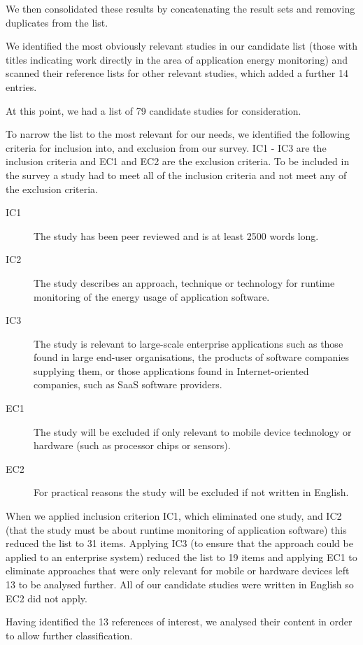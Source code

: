 We then consolidated these results by concatenating the result sets and removing duplicates from the list.

We identified the most obviously relevant studies in our candidate list (those with titles indicating work directly in the area of application energy monitoring) and scanned their reference lists for other relevant studies, which added a further 14 entries.

At this point, we had a list of 79 candidate studies for consideration.

To narrow the list to the most relevant for our needs, we identified the following criteria for inclusion into, and exclusion from our survey.  IC1 - IC3 are the inclusion criteria and EC1 and EC2 are the exclusion criteria.  To be included in the survey a study had to meet all of the inclusion criteria and not meet any of the exclusion criteria.

\begin{description}
	\item[IC1] The study has been peer reviewed and is at least 2500 words long.
	\item[IC2] The study describes an approach, technique or technology for runtime monitoring of the energy usage of application software.
	\item[IC3] The study is relevant to large-scale enterprise applications such as those found in large end-user organisations, the products of software companies supplying them, or those applications found in Internet-oriented companies, such as SaaS software providers.
	\item[EC1] The study will be excluded if only relevant to mobile device technology or hardware (such as processor chips or sensors).
	\item[EC2] For practical reasons the study will be excluded if not written in English.
\end{description}

When we applied inclusion criterion IC1, which eliminated one study, and IC2 (that the study must be about runtime monitoring of application software) this reduced the list to 31 items.  Applying IC3 (to ensure that the approach could be applied to an enterprise system) reduced the list to 19 items and applying EC1 to eliminate approaches that were only relevant for mobile or hardware devices left 13 to be analysed further.  All of our candidate studies were written in English so EC2 did not apply.

Having identified the 13 references of interest, we analysed their content in order to allow further classification.  

